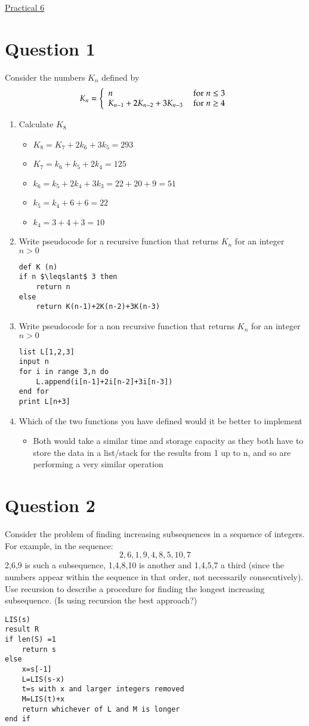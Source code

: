 \documentclass{article}[18pt]
\begin{document}
\begin{center}
\underline{\huge Practical 6}
\end{center}
\section{Question 1}
Consider the numbers $K_n$ defined by
$$K _ { n } = \left\{ \begin{array} { l l } { n } & { \text { for } n \leq 3 } \\ { K _ { n - 1 } + 2 K _ { n - 2 } + 3 K _ { n - 3 } } & { \text { for } n \geq 4 } \end{array} \right.$$
\begin{enumerate}[label=(\alph*)]
\item Calculate $K_8$
\begin{itemize}
	\item $K_8=K_7+2k_6+3k_5=293$
	\item $K_7=k_6+k_5+2k_4=125$
	\item $k_6=k_5+2k_4+3k_3=22+20+9=51$
	\item $k_5=k_4+6+6=22$
	\item $k_4=3+4+3=10$
\end{itemize}
\item Write pseudocode for a recursive function that returns $K_n$ for an integer $n>0$
\begin{lstlisting}
def K (n)
if n $\leqslant$ 3 then
	return n
else
	return K(n-1)+2K(n-2)+3K(n-3)
\end{lstlisting}
\item Write pseudocode for a non recursive function that returns $K_n$ for an integer $n>0$
\begin{lstlisting}
list L[1,2,3]
input n
for i in range 3,n do
	L.append(i[n-1]+2i[n-2]+3i[n-3])
end for
print L[n+3]	
\end{lstlisting}
\item Which of the two functions you have defined would it be better to implement
\begin{itemize}
	\item Both would take a similar time and storage capacity as they both have to store the data in a list/stack for the results from 1 up to n, and so are performing a very similar operation
\end{itemize}
\end{enumerate}
\section{Question 2}
Consider the problem of finding increasing subsequences in a sequence of
integers. For example, in the sequence:
$$2, 6, 1, 9, 4, 8, 5, 10, 7$$
2,6,9 is such a subsequence, 1,4,8,10 is another and 1,4,5,7 a third (since the
numbers appear within the sequence in that order, not necessarily consecutively).
Use recursion to describe a procedure for finding the longest increasing
subsequence. (Is using recursion the best approach?)
\begin{lstlisting}
LIS(s)
result R
if len(S) =1
	return s
else
	x=s[-1]
	L=LIS(s-x)
	t=s with x and larger integers removed
	M=LIS(t)+x
	return whichever of L and M is longer
end if
\end{lstlisting}
\end{document}
